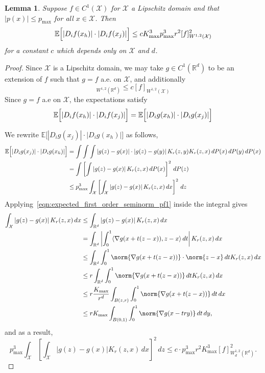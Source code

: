 \documentclass{article}
\newcommand{\Reals}{\mathbb{R}}
\newcommand{\abs}[1]{\left \lvert #1 \right \rvert}
\newcommand{\1}{\mathbf{1}}
\newcommand{\Rd}{\Reals^d}
\newcommand{\Xset}{\mathcal{X}}
\newcommand{\Ebb}{\mathbb{E}}
\newcommand{\dotp}[2]{\langle #1, #2 \rangle}
\theoremstyle{alden}
\theoremstyle{aldenthm}
\newtheorem{lemma}{Lemma}
\theoremstyle{definition}
\theoremstyle{remark}
\begin{document}
\begin{lemma}
	\label{lem:expected_first_order_seminorm_2}
	Suppose $f \in C^{1}(\Xset)$ for $\Xset$ a Lipschitz domain and that $\abs{p(x)} \leq p_{\max}$ for all $x \in \Xset$. Then
	\begin{equation*}
	\Ebb\Bigl[\abs{D_if(x_h)}\cdot\abs{D_if(x_j)} \Bigr] \leq c K_{\max}^3 p_{\max}^3 r^2 [f]_{W^{1,2}(\Xset)}^2
	\end{equation*}
	for a constant $c$ which depends only on $\Xset$ and $d$.
\end{lemma}
\begin{proof}
	Since $\Xset$ is a Lipschitz domain, we may take $g \in C^1(\Rd)$ to be an extension of $f$ such that $g = f$ a.e. on $\Xset$, and additionally
	\begin{equation*}
	[g]_{W^{1,2}(\Rd)} \leq c[f]_{W^{1,2}(\Xset)}
	\end{equation*}
	Since $g = f$ a.e on $\Xset$, the expectations satisfy
	\begin{equation*}
	\Ebb\Bigl[\abs{D_if(x_h)}\cdot\abs{D_if(x_j)} \Bigr] =\Ebb\Bigl[\abs{D_ig(x_h)}\cdot\abs{D_ig(x_j)} \Bigr]
	\end{equation*}
	
	We rewrite $\Ebb\bigl[\abs{D_{i}g(x_j)} \cdot \abs{D_ig(x_h)} \bigr]$ as follows,
	\begin{align*}
	\Ebb\Bigl[\abs{D_{i}g(x_j)} \cdot \abs{D_ig(x_h)} \Bigr] & = \int \int \int \abs{g(z) - g(x)} \cdot \abs{g(z) - g(y)} K_r(z,y) K_r(z,x) \,dP(x) \,dP(y) \,dP(x) \\
	& = \int \left[\int \abs{g(z) - g(x)} K_r(z,x) \,dP(x)\right]^2 \,dP(z) \\
	& \leq p_{\max}^3 \int_{\Xset} \left[\int_{\Xset} \abs{g(z) - g(x)} K_r(z,x) \,dx\right]^2 \,dz
	\end{align*}
	Applying~\eqref{eqn:expected_first_order_seminorm_pf1} inside the integral gives
	\begin{align*}
	\int_{\Xset} \abs{g(z) - g(x)} K_r(z,x) \,dx & \leq \int_{\Rd} \abs{g(z) - g(x)} K_r(z,x) \,dx \\
	& = \int_{\Rd} \abs{\int_{0}^{1} \dotp{\nabla g(x + t(z - x))}{z - x} \,dt} K_r(z,x) \,dx \\
	& \leq \int_{\Rd} \int_{0}^{1} \norm{\nabla g(x + t(z - x))}\cdot\norm{z - x} \,dt K_r(z,x) \,dx \\
	& \leq r \int_{\Rd} \int_{0}^{1} \norm{\nabla g(x + t(z - x))} \,dt K_r(z,x) \,dx \\
	& \leq r \frac{K_{\max}}{r^d} \int_{B(z,r)} \int_{0}^{1} \norm{\nabla g(x + t(z - x))} \,dt  \,dx \\
	& \leq r K_{\max} \int_{B(0,1)} \int_{0}^{1} \norm{\nabla g(x - try)} \,dt  \,dy,
	\end{align*}
	and as a result, 
	\begin{equation*}
	p_{\max}^3 \int_{\Xset} \left[\int_{\Xset} \abs{g(z) - g(x)} K_r(z,x) \,dx\right]^2 \,dz \leq c\cdot p_{\max}^3 r^2 K_{\max}^3 [f]_{W_d^{1,2}(\Rd)}^2.
	\end{equation*}
\end{proof}
\end{document}
